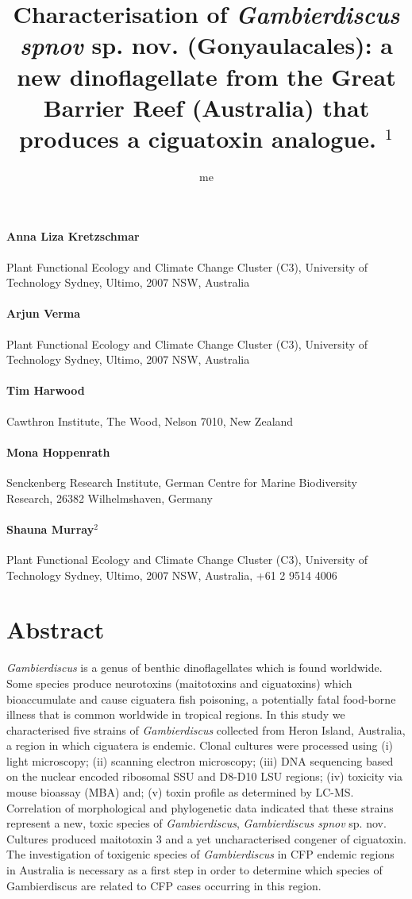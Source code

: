 \documentclass[12pt]{article}
\title{Characterisation of \emph{Gambierdiscus spnov} sp. nov. (Gonyaulacales): a new dinoflagellate from the Great Barrier Reef (Australia) that produces a ciguatoxin analogue. $^{1}$}
\author{me}
\date{}
\begin{document}
\maketitle
\paragraph{Anna Liza Kretzschmar} Plant Functional Ecology and Climate Change Cluster (C3), University of Technology Sydney, Ultimo, 2007 NSW, Australia
\paragraph{Arjun Verma} Plant Functional Ecology and Climate Change Cluster (C3), University of Technology Sydney, Ultimo, 2007 NSW, Australia
\paragraph{Tim Harwood} Cawthron Institute, The Wood, Nelson 7010, New Zealand
\paragraph{Mona Hoppenrath}Senckenberg Research Institute, German Centre for Marine Biodiversity Research, 26382 Wilhelmshaven, Germany
\paragraph{Shauna Murray$^{2}$} Plant Functional Ecology and Climate Change Cluster (C3), University of Technology Sydney, Ultimo, 2007 NSW, Australia, +61 2 9514 4006
\newpage
\section{Abstract}
\textit{Gambierdiscus} is a genus of benthic dinoflagellates which is found worldwide. Some species produce neurotoxins (maitotoxins and ciguatoxins) which  bioaccumulate and cause ciguatera fish poisoning, a potentially fatal food-borne illness that is common worldwide in tropical regions. In this study we characterised five strains of \textit{Gambierdiscus} collected from Heron Island,  Australia, a region in which ciguatera is endemic. Clonal cultures were processed using (i) light microscopy; (ii) scanning electron microscopy; (iii) DNA sequencing based on the nuclear encoded ribosomal  SSU and D8-D10 LSU regions; (iv) toxicity via mouse bioassay (MBA) and; (v) toxin profile as determined by LC-MS. Correlation of morphological and phylogenetic data indicated that these strains represent a new, toxic species of \emph{Gambierdiscus}, \emph{Gambierdiscus spnov} sp. nov. Cultures produced maitotoxin 3 and a yet uncharacterised congener of ciguatoxin. The investigation of toxigenic species of \textit{Gambierdiscus} in CFP endemic regions in Australia is necessary as a first step in order to determine which species of Gambierdiscus are related to CFP cases occurring in this region.
\end{document}
